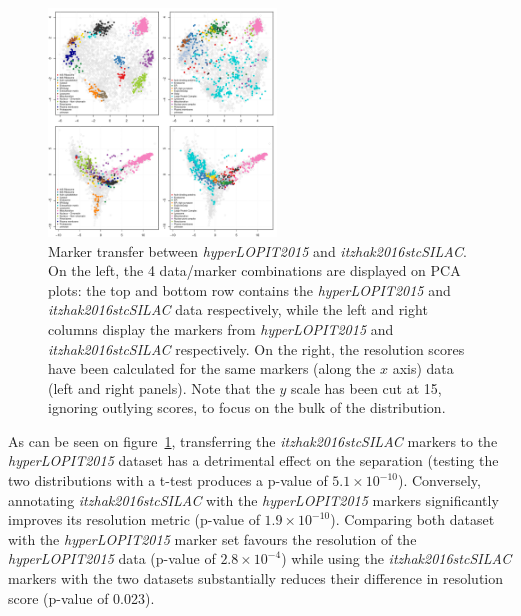 \documentclass[12pt]{article}\usepackage[]{graphicx}\usepackage[]{color}
\begin{document}
\begin{figure}[h]
  \centering
  \includegraphics[width = 0.54\textwidth]{mrkswtch-pca.pdf}
  \caption{Marker transfer between \textit{hyperLOPIT2015} and
    \textit{itzhak2016stcSILAC}. On the left, the 4 data/marker
    combinations are displayed on PCA plots: the top and bottom row
    contains the \textit{hyperLOPIT2015} and
    \textit{itzhak2016stcSILAC} data respectively, while the left and
    right columns display the markers from \textit{hyperLOPIT2015} and
    \textit{itzhak2016stcSILAC} respectively. On the right, the
    resolution scores have been calculated for the same markers (along
    the $x$ axis) data (left and right panels). Note that the $y$
    scale has been cut at 15, ignoring outlying scores, to focus on
    the bulk of the distribution. }
  \label{fig:mrkswtch}
\end{figure}




As can be seen on figure~\ref{fig:mrkswtch}, transferring the
\textit{itzhak2016stcSILAC} markers to the \textit{hyperLOPIT2015}
dataset has a detrimental effect on the separation (testing the two
distributions with a t-test produces a p-value of \ensuremath{5.1\times 10^{-10}}). Conversely, annotating \textit{itzhak2016stcSILAC} with the
\textit{hyperLOPIT2015} markers significantly improves its resolution
metric (p-value of \ensuremath{1.9\times 10^{-10}}). Comparing both dataset
with the \textit{hyperLOPIT2015} marker set favours the resolution of
the \textit{hyperLOPIT2015} data (p-value of \ensuremath{2.8\times 10^{-4}})
while using the \textit{itzhak2016stcSILAC} markers with the two
datasets substantially reduces their difference in resolution score
(p-value of 0.023).
\end{document}
